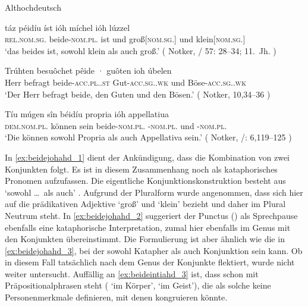 
\begin{exe}
\ex \label{ex:beidejohahd}
	\langinfo%
		{Althochdeutsch}
		{}
		{\cite{ddd}}
	\begin{xlist}
	\ex \label{ex:beidejohahd_1}
		\gll táz péidíu íst ióh míchel ióh lúzzel \\
			\textsc{rel.nom.sg.\NeutI} beide-\textsc{nom.pl.\NeutI} ist und
			groß[\textsc{nom.sg.\NeutI}] und klein[\textsc{nom.sg.\NeutI}] \\
		\trans `das beides ist, sowohl klein als auch groß.'
			(%
				Notker, / 57: 28--34;
				11.~Jh.%
			)

	\ex \label{ex:beidejohahd_2}
		\gll Trúhten besuôchet pêide · guôten ioh
				úbelen \\
			Herr befragt beide-\textsc{acc.pl.\MascA.st} {}
				Gut-\textsc{acc.sg.\MascA.wk} und
				Böse-\textsc{acc.sg.\MascA.wk} \\
		\trans `Der Herr befragt beide, den Guten und den Bösen.'
			(%
				Notker,  10,34--36%
			)

	\ex \label{ex:beidejohahd_3}
		\gll Tíu múgen sîn béidíu propria ióh appellatiua \\
			\textsc{dem.nom.pl.\NeutI} können sein beide-\textsc{nom.pl.\NeutI}
				-\textsc{nom.pl.\NeutI} und
				-\textsc{nom.pl.\NeutI} \\
		\trans `Die können sowohl Propria als auch Appellativa sein.'
			(%
				Notker, /: 6,119--125%
			)
	\end{xlist}
\end{exe}

In \cref{ex:beidejohahd_1} dient  der Ankündigung, dass die
Kombination von zwei Konjunkten folgt. Es ist in diesem Zusammenhang noch als
kataphorisches Pronomen aufzufassen. Die eigentliche Konjunktionskonstruktion
besteht aus  `sowohl \dots\ als auch'
\autocite[vgl.][169]{schuetzeichel2012}. Aufgrund der Pluralform wurde
angenommen, dass  sich hier auf die prädikativen Adjektive
 `groß' und 
`klein' bezieht und daher im Plural Neutrum steht. In
\cref{ex:beidejohahd_2} suggeriert der Punctus () als Sprechpause
ebenfalls eine kataphorische Interpretation, zumal  hier ebenfalls
im Genus mit den Konjunkten übereinstimmt. Die Formulierung ist aber ähnlich
wie die in \cref{ex:beidejohahd_3}, bei der  sowohl Katapher als
auch Konjunktion sein kann. Ob  in diesem Fall tatsächlich nach
dem Genus der Konjunkte flektiert, wurde nicht weiter untersucht.
Auffällig an \cref{ex:beideintiahd_3} ist, dass  schon mit
Präpositionalphrasen steht ( `im Körper',
 `im Geist'), die als solche keine Personenmerkmale
definieren, mit denen  kongruieren könnte.


